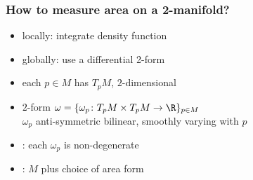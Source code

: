 \begin{frame}
  \frametitle{How to measure area on a 2-manifold?}
  \begin{itemize}
  \item locally: integrate density function
  \item globally: use a differential 2-form
  \item each $p\in M$ has  $T_pM$, $2$-dimensional
  \item $2$-form $\omega = \{\omega_p\colon T_pM\times T_pM\to \R\}_{p\in M}$\\ $\omega_p$ anti-symmetric bilinear, smoothly varying with $p$
  \item {}: each $\omega_p$ is non-degenerate
  \item {}: $M$ plus choice of area form
\end{itemize}
\end{frame}


